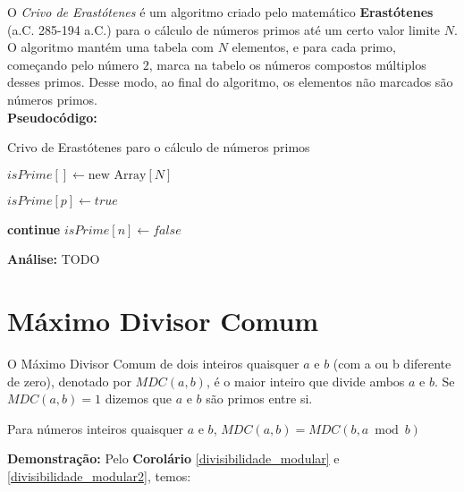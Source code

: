 O \textit{Crivo de Erastótenes} é um algoritmo criado pelo matemático \textbf{Erastótenes} (a.C. 285-194 a.C.) para o cálculo de números primos
até um certo valor limite $N$.
O algoritmo mantém uma tabela com $N$ elementos, e para cada primo, começando pelo número $2$, marca na tabelo os números compostos múltiplos desses primos.
Desse modo, ao final do algoritmo, os elementos não marcados são números primos.\\

\textbf{Pseudocódigo:}
\begin{algorithm}
\caption{Crivo de Erastótenes paro o cálculo de números primos}\label{crivo_erastotenes}
\begin{algorithmic}[1]
\State $isPrime[] \gets \text{new Array}[N]$ 

\State $isPrime[p] \gets true$
\EndFor

\State \textbf{continue}
\EndIf
{}
\State $isPrime[n] \gets false$
\EndFor
\EndFor

\State {}
\EndProcedure
\end{algorithmic}
\end{algorithm}

\textbf{Análise:}
TODO



\section{Máximo Divisor Comum}

\begin{definition}
O Máximo Divisor Comum de dois inteiros quaisquer $a$ e $b$ (com a ou b diferente de zero), denotado por $MDC(a,b)$, é o maior inteiro que divide ambos $a$ e $b$. 
Se $MDC(a,b) = 1$ dizemos que $a$ e $b$ são primos entre si.
\end{definition}


\begin{corollary}\label{gcd_modular}
Para números inteiros quaisquer $a$ e $b$, $MDC(a,b) = MDC(b, a \bmod b)$
\end{corollary}
\textbf{Demonstração:}
Pelo \textbf{Corolário} \autoref{divisibilidade_modular} e \autoref{divisibilidade_modular2}, temos:

